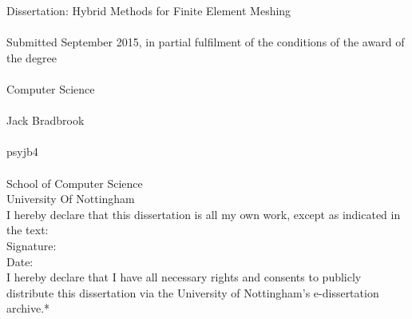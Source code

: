 \documentclass{article}
\begin{document}

\noindent
Dissertation: Hybrid Methods for Finite Element Meshing \\ \\
Submitted September 2015, in partial fulfilment of
the conditions of the award of the degree \\ \\
Computer Science \\ \\
Jack Bradbrook \\ \\
psyjb4 \\ \\
School of Computer Science \\
University Of Nottingham \\ 

\noindent
I hereby declare that this dissertation is all my own work, except as indicated
in the text: \\ 

\noindent
Signature: \\ 

\noindent
Date: \\ 


\noindent
I hereby declare that I have all necessary rights and consents  to publicly
distribute this dissertation via the University of Nottingham's e-dissertation
archive.*
\tableofcontents

\newpage

\cite{einstein}















\end{document}
